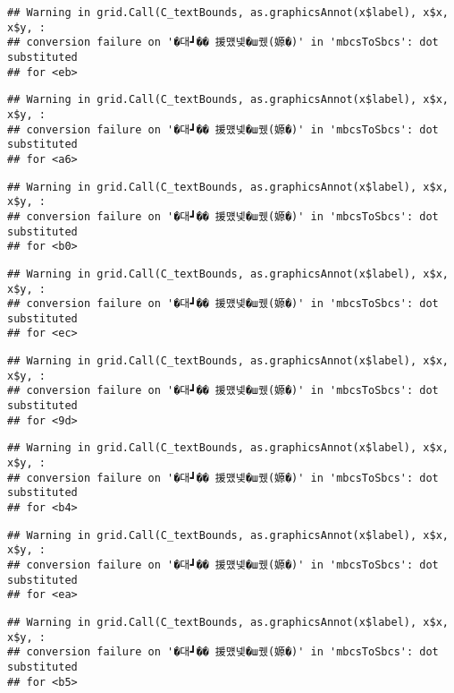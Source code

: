 \documentclass[
]{article}
\begin{document}
\begin{verbatim}
## Warning in grid.Call(C_textBounds, as.graphicsAnnot(x$label), x$x, x$y, :
## conversion failure on '�대┛�� 援먰넻�ш퀬(嫄�)' in 'mbcsToSbcs': dot substituted
## for <eb>
\end{verbatim}

\begin{verbatim}
## Warning in grid.Call(C_textBounds, as.graphicsAnnot(x$label), x$x, x$y, :
## conversion failure on '�대┛�� 援먰넻�ш퀬(嫄�)' in 'mbcsToSbcs': dot substituted
## for <a6>
\end{verbatim}

\begin{verbatim}
## Warning in grid.Call(C_textBounds, as.graphicsAnnot(x$label), x$x, x$y, :
## conversion failure on '�대┛�� 援먰넻�ш퀬(嫄�)' in 'mbcsToSbcs': dot substituted
## for <b0>
\end{verbatim}

\begin{verbatim}
## Warning in grid.Call(C_textBounds, as.graphicsAnnot(x$label), x$x, x$y, :
## conversion failure on '�대┛�� 援먰넻�ш퀬(嫄�)' in 'mbcsToSbcs': dot substituted
## for <ec>
\end{verbatim}

\begin{verbatim}
## Warning in grid.Call(C_textBounds, as.graphicsAnnot(x$label), x$x, x$y, :
## conversion failure on '�대┛�� 援먰넻�ш퀬(嫄�)' in 'mbcsToSbcs': dot substituted
## for <9d>
\end{verbatim}

\begin{verbatim}
## Warning in grid.Call(C_textBounds, as.graphicsAnnot(x$label), x$x, x$y, :
## conversion failure on '�대┛�� 援먰넻�ш퀬(嫄�)' in 'mbcsToSbcs': dot substituted
## for <b4>
\end{verbatim}

\begin{verbatim}
## Warning in grid.Call(C_textBounds, as.graphicsAnnot(x$label), x$x, x$y, :
## conversion failure on '�대┛�� 援먰넻�ш퀬(嫄�)' in 'mbcsToSbcs': dot substituted
## for <ea>
\end{verbatim}

\begin{verbatim}
## Warning in grid.Call(C_textBounds, as.graphicsAnnot(x$label), x$x, x$y, :
## conversion failure on '�대┛�� 援먰넻�ш퀬(嫄�)' in 'mbcsToSbcs': dot substituted
## for <b5>
\end{verbatim}
\end{document}
